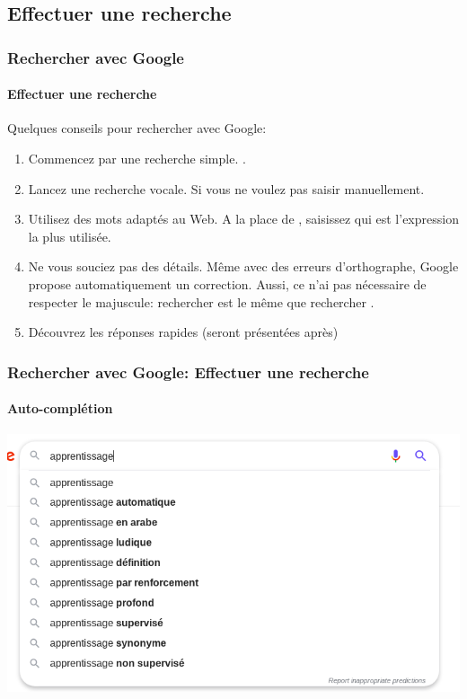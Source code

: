 \documentclass[xcolor=table]{beamer}
\begin{document}
\subsection{Effectuer une recherche}

\begin{frame}
\frametitle{Rechercher avec Google}
\framesubtitle{Effectuer une recherche}

Quelques conseils pour rechercher avec Google: 
\begin{enumerate}
	\item Commencez par une recherche simple. .
	
	\item Lancez une recherche vocale. Si vous ne voulez pas saisir manuellement.
	
	\item Utilisez des mots adaptés au Web. A la place de , saisissez  qui est l'expression la plus utilisée.
	
	\item Ne vous souciez pas des détails. Même avec des erreurs d'orthographe, Google propose automatiquement un correction. Aussi, ce n'ai pas nécessaire de respecter le majuscule: rechercher  est le même que rechercher .
	
	\item Découvrez les réponses rapides (seront présentées après)
\end{enumerate}

\end{frame}

\begin{frame}
\frametitle{Rechercher avec Google: Effectuer une recherche}
\framesubtitle{Auto-complétion}

\begin{center}
	\includegraphics[height=.87\textheight]{..//img/Bweb02-ri-gmail/google-autocomplete.png}
\end{center}

\end{frame}
\end{document}
